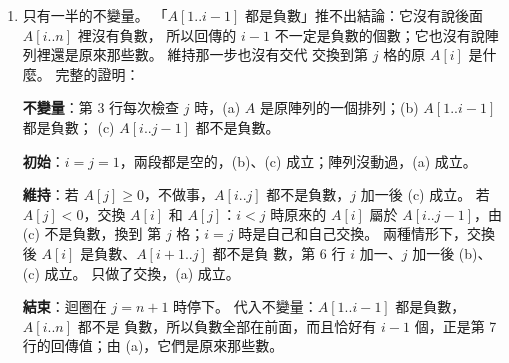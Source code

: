 \begin{enumerate}
\item 只有一半的不變量。 「$A[1..i-1]$ 都是負數」推不出結論：它沒有說後面 $A[i..n]$ 裡沒有負數，
所以回傳的 $i - 1$ 不一定是負數的個數；它也沒有說陣列裡還是原來那些數。 維持那一步也沒有交代
交換到第 $j$ 格的原 $A[i]$ 是什麼。 完整的證明：

\textbf{不變量}：第 3 行每次檢查 $j$ 時，(a) $A$ 是原陣列的一個排列；(b) $A[1..i-1]$ 都是負數；
(c) $A[i..j-1]$ 都不是負數。

\textbf{初始}：$i = j = 1$，兩段都是空的，(b)、(c) 成立；陣列沒動過，(a) 成立。

\textbf{維持}：若 $A[j] \ge 0$，不做事，$A[i..j]$ 都不是負數，$j$ 加一後 (c) 成立。 若
$A[j] < 0$，交換 $A[i]$ 和 $A[j]$：$i < j$ 時原來的 $A[i]$ 屬於 $A[i..j-1]$，由 (c) 不是負數，換到
第 $j$ 格；$i = j$ 時是自己和自己交換。 兩種情形下，交換後 $A[i]$ 是負數、$A[i+1..j]$ 都不是負
數，第 6 行 $i$ 加一、$j$ 加一後 (b)、(c) 成立。 只做了交換，(a) 成立。

\textbf{結束}：迴圈在 $j = n + 1$ 時停下。 代入不變量：$A[1..i-1]$ 都是負數，$A[i..n]$ 都不是
負數，所以負數全部在前面，而且恰好有 $i - 1$ 個，正是第 7 行的回傳值；由 (a)，它們是原來那些數。
\end{enumerate}
